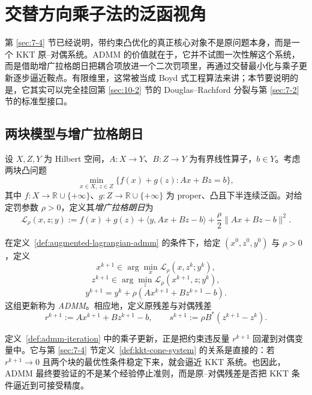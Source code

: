 \section{交替方向乘子法的泛函视角}

\label{sec:10-3}

第 \ref{sec:7-4} 节已经说明，带约束凸优化的真正核心对象不是原问题本身，而是一个 KKT 原--对偶系统。ADMM 的价值就在于，它并不试图一次性解这个系统，而是借助增广拉格朗日把耦合项放进一个二次罚项里，再通过交替最小化与乘子更新逐步逼近鞍点。有限维里，这常被当成 Boyd 式工程算法来讲；本节要说明的是，它其实可以完全挂回第 \ref{sec:10-2} 节的 Douglas--Rachford 分裂与第 \ref{sec:7-2} 节的标准型接口。

\subsection{两块模型与增广拉格朗日}

\begin{definition}\label{def:augmented-lagrangian-admm}
设 $X,Z,Y$ 为 Hilbert 空间，$A\colon X\to Y$、$B\colon Z\to Y$ 为有界线性算子，$b\in Y$。考虑两块凸问题
\[
\min_{x\in X,\ z\in Z}\{f(x)+g(z):Ax+Bz=b\},
\]
其中 $f\colon X\to \mathbb R\cup\{+\infty\}$、$g\colon Z\to \mathbb R\cup\{+\infty\}$ 为 proper、凸且下半连续泛函。对给定罚参数 $\rho>0$，定义其\emph{增广拉格朗日}为
\[
\mathcal L_\rho(x,z;y)
:=
f(x)+g(z)+\langle y,Ax+Bz-b\rangle+\frac{\rho}{2}\|Ax+Bz-b\|^2.
\]
\end{definition}

\begin{definition}[ADMM 迭代]\label{def:admm-iteration}
在定义~\ref{def:augmented-lagrangian-admm} 的条件下，给定 $(x^0,z^0,y^0)$ 与 $\rho>0$，定义
\[
x^{k+1}\in \arg\min_x \mathcal L_\rho(x,z^k;y^k),
\]
\[
z^{k+1}\in \arg\min_z \mathcal L_\rho(x^{k+1},z;y^k),
\]
\[
y^{k+1}=y^k+\rho(Ax^{k+1}+Bz^{k+1}-b).
\]
这组更新称为 \emph{ADMM}。相应地，定义原残差与对偶残差
\[
r^{k+1}:=Ax^{k+1}+Bz^{k+1}-b,
\qquad
s^{k+1}:=\rho B^\ast(z^{k+1}-z^k).
\]
\end{definition}

\begin{remark}
定义~\ref{def:admm-iteration} 中的乘子更新，正是把约束违反量 $r^{k+1}$ 回灌到对偶变量中。它与第 \ref{sec:7-4} 节定义~\ref{def:kkt-cone-system} 的关系是直接的：若 $r^{k+1}\to 0$ 且两个块的最优性条件稳定下来，就会逼近 KKT 系统。也因此，ADMM 最终要验证的不是某个经验停止准则，而是原--对偶残差是否把 KKT 条件逼近到可接受精度。
\end{remark}

